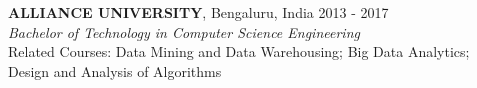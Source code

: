 \documentclass[a4paper]{article}
\newcommand{\myline}{\par
  \kern2pt %
  \hrule height 0.5pt
  \kern2pt %
}
\newcommand{\mybullet}{
	\indent 
  \textbullet \hspace*{2mm}
}
\begin{document}
 	\noindent
	\textbf{ALLIANCE UNIVERSITY}, Bengaluru, India \hfill 2013 - 2017 \\
	\textit{Bachelor of Technology in Computer Science Engineering} \\
  Related Courses: Data Mining and Data Warehousing; Big Data Analytics; Design and Analysis of Algorithms \\

	
	

\end{document}
